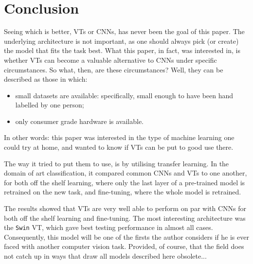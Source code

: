 \section{Conclusion}

Seeing which is better, VTs or CNNs, has never been the goal of this paper. The underlying architecture is not important, as one should always pick (or create) the model that fits the task best. What this paper, in fact, was interested in, is whether VTs can become a valuable alternative to CNNs under specific circumstances. So what, then, are these circumstances? Well, they can be described as those in which:
\begin{itemize}
\item small datasets are available: specifically, small enough to have been hand labelled by one person;
\item only consumer grade hardware is available.
\end{itemize}
In other words: this paper was interested in the type of machine learning one could try at home, and wanted to know if VTs can be put to good use there.

The way it tried to put them to use, is by utilising transfer learning. In the domain of art classification, it compared common CNNs and VTs to one another, for both off the shelf learning, where only the last layer of a pre-trained model is retrained on the new task, and fine-tuning, where the whole model is retrained.

The results showed that VTs are very well able to perform on par with CNNs for both off the shelf learning and fine-tuning. The most interesting architecture was the \texttt{Swin} VT, which gave best testing performance in almost all cases. Consequently, this model will be one of the firsts the author considers if he is ever faced with another computer vision task. Provided, of course, that the field does not catch up in ways that draw all models described here obsolete...

